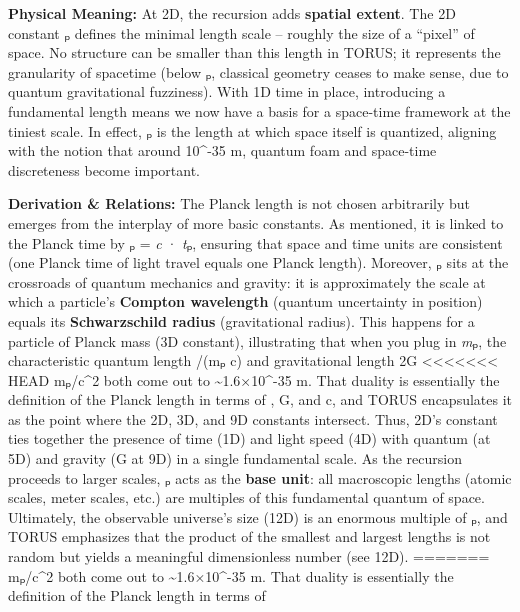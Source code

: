 \documentclass[]{article}
\begin{document}
\textbf{Physical Meaning:} At 2D, the recursion adds \textbf{spatial
extent}. The 2D constant \emph{\ell}ₚ defines the minimal length scale --
roughly the size of a ``pixel'' of space. No structure can be smaller
than this length in TORUS; it represents the granularity of spacetime
(below \emph{\ell}ₚ, classical geometry ceases to make sense, due to
quantum gravitational fuzziness). With 1D time in place, introducing a
fundamental length means we now have a basis for a space-time framework
at the tiniest scale. In effect, \emph{\ell}ₚ is the length at which space
itself is quantized, aligning with the notion that around 10\^{}-35 m,
quantum foam and space-time discreteness become important.

\textbf{Derivation \& Relations:} The Planck length is not chosen
arbitrarily but emerges from the interplay of more basic constants. As
mentioned, it is linked to the Planck time by \emph{\ell}ₚ = \emph{c} ·
\emph{t}ₚ, ensuring that space and time units are consistent (one Planck
time of light travel equals one Planck length). Moreover, \emph{\ell}ₚ sits
at the crossroads of quantum mechanics and gravity: it is approximately
the scale at which a particle's \textbf{Compton wavelength} (quantum
uncertainty in position) equals its \textbf{Schwarzschild radius}
(gravitational radius). This happens for a particle of Planck mass (3D
constant), illustrating that when you plug in \emph{m}ₚ, the
characteristic quantum length \hbar/(mₚ c) and gravitational length 2G
<<<<<<< HEAD
mₚ/c\^{}2 both come out to \textasciitilde1.6×10\^{}-35 m\hspace{0pt}.
That duality is essentially the definition of the Planck length in terms
of \hbar, G, and c, and TORUS encapsulates it as the point where the 2D, 3D,
and 9D constants intersect. Thus, 2D's constant ties together the
presence of time (1D) and light speed (4D) with quantum (\hbar at 5D) and
gravity (G at 9D) in a single fundamental scale\hspace{0pt}. As the
recursion proceeds to larger scales, \emph{\ell}ₚ acts as the \textbf{base
unit}: all macroscopic lengths (atomic scales, meter scales, etc.) are
multiples of this fundamental quantum of space. Ultimately, the
observable universe's size (12D) is an enormous multiple of \emph{\ell}ₚ,
and TORUS emphasizes that the product of the smallest and largest
lengths is not random but yields a meaningful dimensionless number (see
12D)\hspace{0pt}.
=======
mₚ/c\^{}2 both come out to \textasciitilde{}1.6×10\^{}-35 m​. That
duality is essentially the definition of the Planck length in terms of
\end{document}
